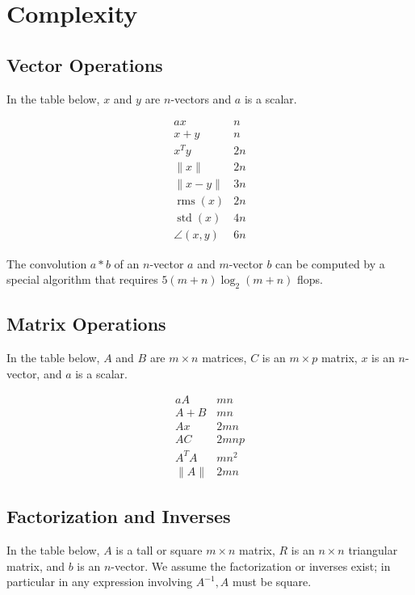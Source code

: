 \chapter{Complexity}

\section{Vector Operations}

In the table below, $ x $ and $ y $ are $ n $-vectors and $ a $ is a scalar.

$$ \begin{array}{ll}a x & n \\ x+y & n \\ x^{T} y & 2 n \\ \|x\| & 2 n \\ \|x-y\| & 3 n \\ \operatorname{rms}(x) & 2 n \\ \operatorname{std}(x) & 4 n \\ \angle(x, y) & 6 n\end{array} $$


The convolution $ a * b $ of an $ n $-vector $ a $ and $ m $-vector $ b $ can be computed by a special algorithm that requires $ 5(m+n) \log _{2}(m+n) $ flops.

\section{Matrix Operations}

In the table below, $ A $ and $ B $ are $ m \times n $ matrices, $ C $ is an $ m \times p $ matrix, $ x $ is an $ n $-vector, and $ a $ is a scalar.

$$ \begin{array}{ll}a A & m n \\ A+B & m n \\ A x & 2 m n \\ A C & 2 m n p \\ A^{T} A & m n^{2} \\ \|A\| & 2 m n\end{array} $$

\section{Factorization and Inverses}

In the table below, $ A $ is a tall or square $ m \times n $ matrix, $ R $ is an $ n \times n $ triangular matrix, and $ b $ is an $ n $-vector. We assume the factorization or inverses exist; in particular in any expression involving $ A^{-1}, A $ must be square.

